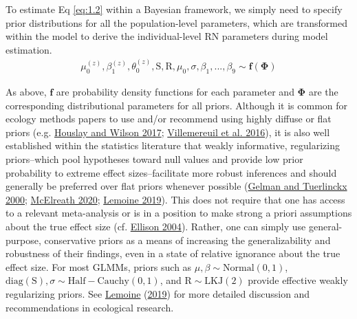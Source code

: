 \documentclass{article}
\begin{document}
To estimate Eq \ref{eq:1.2} within a Bayesian framework, we simply need
to specify prior distributions for all the population-level parameters,
which are transformed within the model to derive the individual-level RN
parameters during model estimation. \begin{align*}
\mu_0^{(z)},\beta_1^{(z)}, \theta_0^{(z)}, \boldsymbol{\mathrm{S}}, \boldsymbol{\mathrm{R}}, \mu_0, \sigma, \beta_1, ... , \beta_9
\sim \boldsymbol{f}(\boldsymbol{\Phi})
\end{align*}

As above, \(\boldsymbol{f}\) are probability density functions for each
parameter and \(\boldsymbol{\Phi}\) are the corresponding distributional
parameters for all priors. Although it is common for ecology methods
papers to use and/or recommend using highly diffuse or flat priors (e.g.
\protect\hyperlink{ref-Hous2017}{Houslay and Wilson 2017};
\protect\hyperlink{ref-Vill2016}{Villemereuil et al. 2016}), it is also
well established within the statistics literature that weakly
informative, regularizing priors--which pool hypotheses toward null
values and provide low prior probability to extreme effect
sizes--facilitate more robust inferences and should generally be
preferred over flat priors whenever possible
(\protect\hyperlink{ref-Gelman2000}{Gelman and Tuerlinckx 2000};
\protect\hyperlink{ref-Rethinking}{McElreath 2020};
\protect\hyperlink{ref-Lemoine2019}{Lemoine 2019}). This does not
require that one has access to a relevant meta-analysis or is in a
position to make strong a priori assumptions about the true effect size
(cf. \protect\hyperlink{ref-Ellison2004}{Ellison 2004}). Rather, one can
simply use general-purpose, conservative priors as a means of increasing
the generalizability and robustness of their findings, even in a state
of relative ignorance about the true effect size. For most GLMMs, priors
such as \(\mu,\beta \sim \mathrm{Normal}(0,1)\),
\(\mathrm{diag}(\boldsymbol{\mathrm{S}}),\sigma \sim \mathrm{Half-Cauchy}(0,1)\),
and \(\boldsymbol{\mathrm{R}} \sim \mathrm{LKJ}(2)\) provide effective
weakly regularizing priors. See
\protect\hyperlink{ref-Lemoine2019}{Lemoine}
(\protect\hyperlink{ref-Lemoine2019}{2019}) for more detailed discussion
and recommendations in ecological research.
\end{document}
